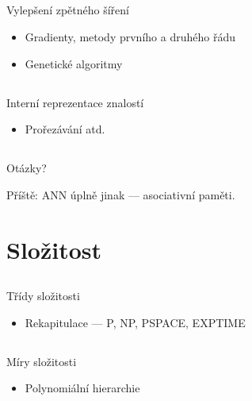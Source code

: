 \documentclass{beamer}
\begin{document}
\subsection{}
\begin{frame}{Vylepšení zpětného šíření}
\begin{itemize}
\item Gradienty, metody prvního a druhého řádu
\item Genetické algoritmy
\end{itemize}
\end{frame}

\subsection{}
\begin{frame}{Interní reprezentace znalostí}
\begin{itemize}
\item Prořezávání atd.
\end{itemize}
\end{frame}

\subsection{}
\begin{frame}{Otázky?}
\begin{center}
Příště: ANN úplně jinak --- asociativní paměti.
\end{center}
\end{frame}

\section{Složitost}

\subsection{}
\begin{frame}{Třídy složitosti}
\begin{itemize}
\item Rekapitulace --- P, NP, PSPACE, EXPTIME
\end{itemize}
\end{frame}

\subsection{}
\begin{frame}{Míry složitosti}
\begin{itemize}
\item Polynomiální hierarchie
\end{itemize}
\end{frame}
\end{document}
